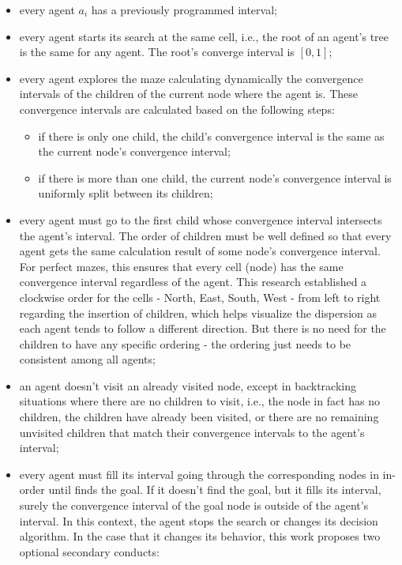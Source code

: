 \begin{itemize}
\item every agent $a_{i}$ has a previously programmed interval;

\item every agent starts its search at the same cell, i.e., the root of an agent's tree is the same for any agent. The root's converge interval is $[0,1]$;

\item every agent explores the maze calculating dynamically the convergence intervals of the children of the current node where the agent is. These convergence intervals are calculated based on the following steps:

	\begin{itemize}

	\item if there is only one child, the child's convergence interval is the same as the current node's convergence interval;
	
	\item if there is more than one child, the current node's convergence interval is uniformly split between its children;
	
	\end{itemize}
	
\item every agent must go to the first child whose convergence interval intersects the agent's interval. The order of children must be well defined so that every agent gets the same calculation result of some node's convergence interval. For perfect mazes, this ensures that every cell (node) has the same convergence interval regardless of the agent. This research established a clockwise order for the cells - North, East, South, West - from left to right regarding the insertion of children, which helps visualize the dispersion as each agent tends to follow a different direction. But there is no need for the children to have any specific ordering - the ordering just needs to be consistent among all agents;

\item an agent doesn't visit an already visited node, except in backtracking situations where there are no children to visit, i.e., the node in fact has no children, the children have already been visited, or there are no remaining unvisited children that match their convergence intervals to the agent's interval;

\item every agent must fill its interval going through the corresponding nodes in in-order until finds the goal. If it doesn't find the goal, but it fills its interval, surely the convergence interval of the goal node is outside of the agent's interval. In this context, the agent stops the search or changes its decision algorithm. In the case that it changes its behavior, this work proposes two optional secondary conducts:


\end{itemize}
